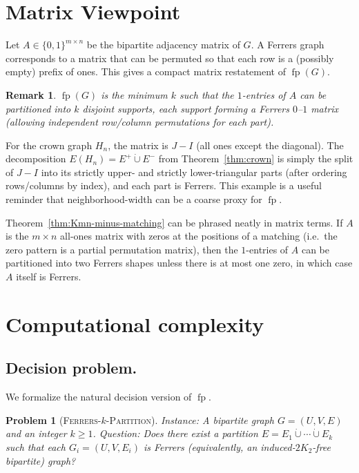 \documentclass[12pt]{amsart}
\newtheorem{remark}[theorem]{Remark}
\newtheorem{problem}[theorem]{Problem}
\newcommand{\fp}{\operatorname{fp}}
\begin{document}
\section{Matrix Viewpoint}
\label{sec:matrix}

Let $A\in\{0,1\}^{m\times n}$ be the bipartite adjacency matrix of $G$.
A Ferrers graph corresponds to a matrix that can be permuted so that each row is a (possibly empty) prefix of ones.
This gives a compact matrix restatement of $\fp(G)$.

\begin{remark}
\label{rem:matrix}
$\fp(G)$ is the minimum $k$ such that the $1$-entries of $A$ can be partitioned into $k$ disjoint supports, each support forming a Ferrers $0$--$1$ matrix (allowing independent row/column permutations for each part).
\end{remark}

For the crown graph $H_n$, the matrix is $J-I$ (all ones except the diagonal).
The decomposition $E(H_n)=E^+\dot\cup E^-$ from Theorem~\ref{thm:crown} is simply the split of $J-I$ into its strictly upper- and strictly lower-triangular parts (after ordering rows/columns by index), and each part is Ferrers.
This example is a useful reminder that neighborhood-width can be a coarse proxy for $\fp$.

Theorem~\ref{thm:Kmn-minus-matching} can be phrased neatly in matrix terms.
If $A$ is the $m\times n$ all-ones matrix with zeros at the positions of a matching (i.e.\ the zero pattern is a partial permutation matrix), then the $1$-entries of $A$ can be partitioned into two Ferrers shapes unless there is at most one zero, in which case $A$ itself is Ferrers.

\section{Computational complexity}\label{sec:complexity}

\subsection{Decision problem.}

We formalize the natural decision version of $\fp$.

\begin{problem}[\textsc{Ferrers-$k$-Partition}]\label{prob:ferrers-k-partition}
Instance: A bipartite graph $G=(U,V,E)$ and an integer $k\ge 1$.
Question: Does there exist a partition $E=E_1\dot\cup\cdots\dot\cup E_k$ such that each
$G_i=(U,V,E_i)$ is Ferrers (equivalently, an induced-$2K_2$-free bipartite) graph?
\end{problem}
\end{document}
